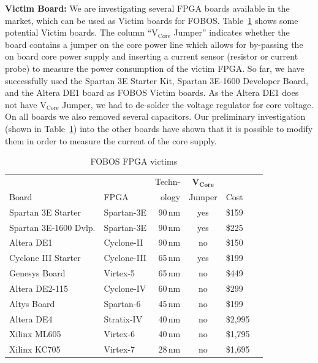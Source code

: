 \documentclass{llncs}
\numberwithin{algorithm}{chapter}
\begin{document}
\textbf{Victim Board:} We are investigating several FPGA boards available 
in the market, which can be used as Victim boards for FOBOS. Table~\ref{tab:fobosvictim} 
shows some potential Victim boards. The column ``$\mathrm{V_{Core}}$ Jumper''  
indicates whether the board contains a jumper on the core power line which allows for
by-passing the on board core power supply and inserting a current sensor (resistor or 
current probe) to measure the power consumption of the victim FPGA. 
So far, we have successfully used the Spartan 3E Starter Kit, Spartan 3E-1600 Developer 
Board, and the Altera DE1 board as FOBOS Victim boards. As the Altera DE1 does not have
$\mathrm{V_{Core}}$ Jumper, we had to de-solder the voltage regulator for core voltage.
On all boards we also removed several capacitors.
Our preliminary investigation (shown in Table~\ref{tab:fobosvictim}) into the 
other boards have shown that it is possible to modify them
in order to measure the current of the core supply.

\begin{table}[ht]%
 \vspace{-2ex}%
  \centering%
  \caption{FOBOS FPGA victims}%
  \label{tab:fobosvictim}%
  \begin{tabular}{|l|l|r|c|l|r|}\hline
                        &               &{Techn-}&{$\mathbf{V_{Core}}$}        &   \\
  {{Board}}       & {{FPGA}}&{ology} &{Jumper}    & {{Cost}}\\ \hline
  Spartan 3E Starter    & Spartan-3E    & 90\,nm & yes        & \$159\\
  Spartan 3E-1600 Dvlp. & Spartan-3E    & 90\,nm & yes        & \$225\\
  Altera DE1            & Cyclone-II    & 90\,nm & no         & \$150\\
  Cyclone III Starter   & Cyclone-III   & 65\,nm & yes        & \$199\\ 
  Genesys Board         & Virtex-5      & 65\,nm & no         & \$449\\
  Altera DE2-115        & Cyclone-IV    & 60\,nm & no         & \$299\\
  Altys Board           & Spartan-6     & 45\,nm & no         & \$199\\
  Altera DE4            & Stratix-IV    & 40\,nm & no         & \$2,995\\
  Xilinx ML605          & Virtex-6      & 40\,nm & no         & \$1,795\\
  Xilinx KC705          & Virtex-7      & 28\,nm & no         & \$1,695\\
\hline
  \end{tabular}%
  \vspace{-3ex}%
\end{table}
\end{document}
